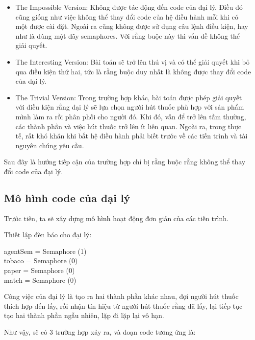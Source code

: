 \documentclass[a4paper]{article}
\begin{document}
	\begin{itemize}
		\item The Impossible Version: Không được tác động đến code của đại lý. Điều đó cũng 
		giống như việc không thể thay đổi code của hệ điều hành mỗi khi có một được cài đặt. Ngoài ra
		cũng không được sử dụng câu lệnh điều kiện, hay như là dùng một dãy semaphores.  
		Với rằng buộc này thì vấn đề không thể giải quyết. 
		\item The Interesting Version: Bài toán sẽ trở lên thú vị và có thể giải quyết khi
		bỏ qua điều kiện thứ hai, tức là rằng buộc duy nhất là không được thay đổi code của đại lý.
		\item The Trivial Version: Trong trường hợp khác, bài toán được phép giải quyết với
		điều kiện rằng đại lý sẽ lựa chọn người hút thuốc phù hợp với sản phẩm mình làm ra rồi phân 
		phối cho người đó. Khi đó, vấn để trở lên tầm thường, các thành phần và việc hút thuốc trở 
		lên ít liên quan. Ngoài ra, trong thực tế, rất khó khăn khi bắt hệ điều hành phải biết trước
		về các tiến trình và tài nguyên chúng yêu cầu. 
	\end{itemize}

	Sau đây là hướng tiếp cận của trường hợp chỉ bị rằng buộc rằng không thể thay đổi code của đại lý.

	\subsection{Mô hình code của đại lý}
	Trước tiên, ta sẽ xây dựng mô hình hoạt động đơn giản của các tiến trình.

	Thiết lập đèn báo cho đại lý:

	\begin{tcolorbox}
		agentSem = Semaphore (1)\\
		tobaco = Semaphore (0)\\
		paper = Semaphore (0)\\
		match = Semaphore (0)
	\end{tcolorbox}

	Công việc của đại lý là tạo ra hai thành phần khác nhau, đợi người hút thuốc thích hợp đến lấy,
	rồi nhận tín hiệu từ người hút thuốc rằng đã lấy, lại tiếp tục tạo hai thành phần ngẫu nhiên, lặp đi lặp lại vô hạn.

	Như vậy, sẽ có 3 trường hợp xảy ra, và đoạn code tương ứng là:
	
\end{document}
